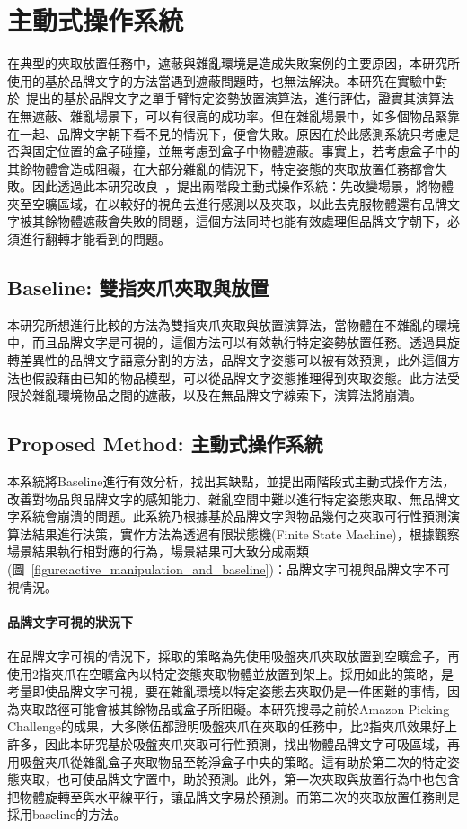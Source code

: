 \section{主動式操作系統}
在典型的夾取放置任務中，遮蔽與雜亂環境是造成失敗案例的主要原因，本研究所使用的基於品牌文字的方法當遇到遮蔽問題時，也無法解決。本研究在實驗中對於~\cite{peterthesis}提出的基於品牌文字之單手臂特定姿勢放置演算法，進行評估，證實其演算法在無遮蔽、雜亂場景下，可以有很高的成功率。但在雜亂場景中，如多個物品緊靠在一起、品牌文字朝下看不見的情況下，便會失敗。原因在於此感測系統只考慮是否與固定位置的盒子碰撞，並無考慮到盒子中物體遮蔽。事實上，若考慮盒子中的其餘物體會造成阻礙，在大部分雜亂的情況下，特定姿態的夾取放置任務都會失敗。因此透過此本研究改良~\cite{peterthesis}，提出兩階段主動式操作系統：先改變場景，將物體夾至空曠區域，在以較好的視角去進行感測以及夾取，以此去克服物體還有品牌文字被其餘物體遮蔽會失敗的問題，這個方法同時也能有效處理但品牌文字朝下，必須進行翻轉才能看到的問題。


\subsection{Baseline: 雙指夾爪夾取與放置}
本研究所想進行比較的方法為雙指夾爪夾取與放置演算法，當物體在不雜亂的環境中，而且品牌文字是可視的，這個方法可以有效執行特定姿勢放置任務。透過具旋轉差異性的品牌文字語意分割的方法，品牌文字姿態可以被有效預測，此外這個方法也假設藉由已知的物品模型，可以從品牌文字姿態推理得到夾取姿態。此方法受限於雜亂環境物品之間的遮蔽，以及在無品牌文字線索下，演算法將崩潰。



\subsection{Proposed Method: 主動式操作系統}
本系統將Baseline進行有效分析，找出其缺點，並提出兩階段式主動式操作方法，改善對物品與品牌文字的感知能力、雜亂空間中難以進行特定姿態夾取、無品牌文字系統會崩潰的問題。此系統乃根據基於品牌文字與物品幾何之夾取可行性預測演算法結果進行決策，實作方法為透過有限狀態機(Finite State Machine)，根據觀察場景結果執行相對應的行為，場景結果可大致分成兩類(圖~\ref{figure:active_manipulation_and_baseline})：品牌文字可視與品牌文字不可視情況。



\paragraph{品牌文字可視的狀況下}
在品牌文字可視的情況下，採取的策略為先使用吸盤夾爪夾取放置到空曠盒子，再使用2指夾爪在空曠盒內以特定姿態夾取物體並放置到架上。採用如此的策略，是考量即使品牌文字可視，要在雜亂環境以特定姿態去夾取仍是一件困難的事情，因為夾取路徑可能會被其餘物品或盒子所阻礙。本研究搜尋之前於Amazon Picking Challenge的成果，大多隊伍都證明吸盤夾爪在夾取的任務中，比2指夾爪效果好上許多，因此本研究基於吸盤夾爪夾取可行性預測，找出物體品牌文字可吸區域，再用吸盤夾爪從雜亂盒子夾取物品至乾淨盒子中央的策略。這有助於第二次的特定姿態夾取，也可使品牌文字置中，助於預測。此外，第一次夾取與放置行為中也包含把物體旋轉至與水平線平行，讓品牌文字易於預測。而第二次的夾取放置任務則是採用baseline的方法。

